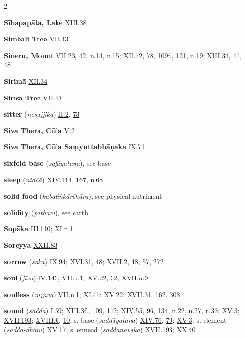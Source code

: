 \begin{multicols}{2}
\begin{vismHanging}
\par\textbf{Sīhapapāta, Lake} \hyperlink{XIII.38}{XIII.38}{}
\par\textbf{Simbali Tree} \hyperlink{VII.43}{VII.43}{}
\par\textbf{Sineru, Mount} \hyperlink{VII.23}{VII.23}{}, \hyperlink{VII.42}{42}{}, \hyperlink{VII.n14}{n.14}{}, \hyperlink{VII.n15}{n.15}{}; \hyperlink{XII.72}{XII.72}{}, \hyperlink{XII.78}{78}{}, \hyperlink{XII.109}{109f.}{}, \hyperlink{XII.121}{121}{}, \hyperlink{XII.n19}{n.19}{}; \hyperlink{XIII.34}{XIII.34}{}, \hyperlink{XIII.41}{41}{}, \hyperlink{XIII.48}{48}{}
\par\textbf{Sirimā} \hyperlink{XII.34}{XII.34}{}
\par\textbf{Sirīsa Tree} \hyperlink{VII.43}{VII.43}{}
\par\textbf{sitter} (\emph{nesajjika}) \hyperlink{II.2}{II.2}{}, \hyperlink{II.73}{73}{}
\par\textbf{Siva Thera, Cūḷa} \hyperlink{V.2}{V.2}{}
\par\textbf{Siva Thera, Cūḷa Saṃyuttabhāṇaka} \hyperlink{IX.71}{IX.71}{}
\par\textbf{sixfold base} (\emph{saḷāyatana}), see base
\par\textbf{sleep} (\emph{niddā}) \hyperlink{XIV.114}{XIV.114}{}, \hyperlink{XIV.167}{167}{}, \hyperlink{XIV.n68}{n.68}{}
\par\textbf{solid food} (\emph{kabaliṅkārāhāra}), see physical nutriment 
\par\textbf{solidity} (\emph{paṭhavi}), see earth
\par\textbf{Sopāka} \hyperlink{III.110}{III.110}{}; \hyperlink{XI.n1}{XI.n.1}{}
\par\textbf{Soreyya} \hyperlink{XXII.83}{XXII.83}{}
\par\textbf{sorrow} (\emph{soka}) \hyperlink{IX.94}{IX.94}{}; \hyperlink{XVI.31}{XVI.31}{}, \hyperlink{XVI.48}{48}{}; \hyperlink{XVII.2}{XVII.2}{}, \hyperlink{XVII.48}{48}{}, \hyperlink{XVII.57}{57}{}, \hyperlink{XVII.272}{272}{}
\par\textbf{soul} (\emph{jīva}) \hyperlink{IV.143}{IV.143}{}; \hyperlink{VII.n1}{VII.n.1}{}; \hyperlink{XV.22}{XV.22}{}, \hyperlink{XV.32}{32}{}; \hyperlink{XVII.n9}{XVII.n.9}{}
\par\textbf{soulless} (\emph{nijjīva}) \hyperlink{VII.n1}{VII.n.1}{}; \hyperlink{XI.41}{XI.41}{}; \hyperlink{XV.22}{XV.22}{}; \hyperlink{XVII.31}{XVII.31}{}, \hyperlink{XVII.162}{162}{}, \hyperlink{XVII.308}{308}{}
\par\textbf{sound} (\emph{sadda}) \hyperlink{I.59}{I.59}{}; \hyperlink{XIII.3}{XIII.3f.}{}, \hyperlink{XIII.109}{109}{}, \hyperlink{XIII.112}{112}{}; \hyperlink{XIV.55}{XIV.55}{}, \hyperlink{XIV.96}{96}{}, \hyperlink{XIV.134}{134}{}, \hyperlink{XIV.n22}{n.22}{}, \hyperlink{XIV.n27}{n.27}{}, \hyperlink{XIV.n33}{n.33}{}; \hyperlink{XV.3}{XV.3}{}; \hyperlink{XVII.193}{XVII.193}{}; \hyperlink{XVIII.6}{XVIII.6}{}, \hyperlink{XVIII.10}{10}{}; s. base (\emph{saddāyatana}) \hyperlink{XIV.76}{XIV.76}{}, \hyperlink{XIV.79}{79}{}; \hyperlink{XV.3}{XV.3}{}; s. element (\emph{sadda-dhātu}) \hyperlink{XV.17}{XV.17}{}; s. ennead (\emph{saddanavaka}) \hyperlink{XVII.193}{XVII.193}{}; \hyperlink{XX.40}{XX.40}{}

\end{vismHanging}
\end{multicols}
